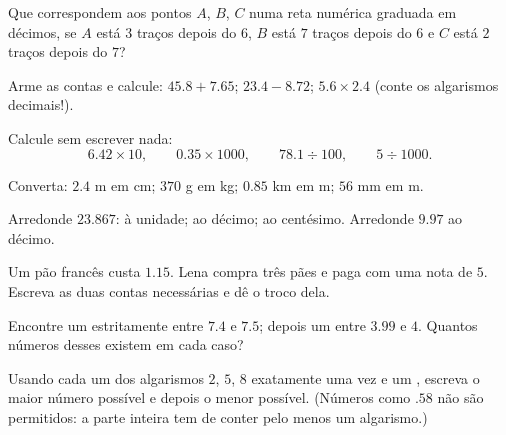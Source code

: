 \begin{exercise}[$\star$]\label{exo:g6:decimals:5}
Que  correspondem aos pontos $A$, $B$, $C$ numa reta
numérica graduada em décimos, se $A$ está $3$ traços depois do $6$, $B$
está $7$ traços depois do $6$ e $C$ está $2$ traços depois do $7$?
\end{exercise}

\begin{exercise}[$\star$]\label{exo:g6:decimals:6}
Arme as contas e calcule: $45.8 + 7.65$; \quad $23.4 - 8.72$; \quad
$5.6 \times 2.4$ (conte os algarismos decimais!).
\end{exercise}

\begin{exercise}[$\star$]\label{exo:g6:decimals:7}
Calcule sem escrever nada:
\[
6.42 \times 10, \qquad
0.35 \times 1000, \qquad
78.1 \div 100, \qquad
5 \div 1000 .
\]
\end{exercise}

\begin{exercise}[$\star$]\label{exo:g6:decimals:8}
Converta: $2.4$ m em cm; \quad $370$ g em kg; \quad $0.85$ km em m;
\quad $56$ mm em m.
\end{exercise}

\begin{exercise}[$\star$]\label{exo:g6:decimals:9}
Arredonde $23.867$: à unidade; ao décimo; ao centésimo. Arredonde
$9.97$ ao décimo.
\end{exercise}

\begin{exercise}[$\star\star$]\label{exo:g6:decimals:10}
Um pão francês custa $1.15$. Lena compra três pães e paga com uma nota
de $5$. Escreva as duas contas necessárias e dê o troco dela.
\end{exercise}

\begin{exercise}[$\star\star$]\label{exo:g6:decimals:11}
Encontre um  estritamente entre $7.4$ e $7.5$; depois um
entre $3.99$ e $4$. Quantos números desses existem em cada caso?
\end{exercise}

\begin{exercise}[$\star\star\star$]\label{exo:g6:decimals:12}
Usando cada um dos algarismos $2$, $5$, $8$ exatamente uma vez e um
, escreva o maior número possível e depois o menor
possível. (Números como $.58$ não são permitidos: a parte inteira tem
de conter pelo menos um algarismo.)
\end{exercise}

